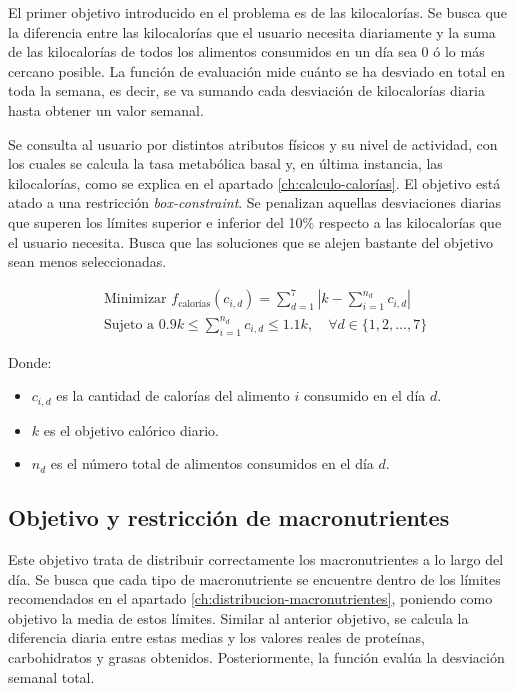 El primer objetivo introducido en el problema es de las kilocalorías. Se busca que la diferencia entre las kilocalorías que el usuario necesita diariamente y la suma de las kilocalorías de todos los alimentos consumidos en un día sea 0 ó lo más cercano posible. La función de evaluación mide cuánto se ha desviado en total en toda la semana, es decir, se va sumando cada desviación de kilocalorías diaria hasta obtener un valor semanal.

Se consulta al usuario por distintos atributos físicos y su nivel de actividad, con los cuales se calcula la tasa metabólica basal y, en última instancia, las kilocalorías, como se explica en el apartado \ref{ch:calculo-calorías}.
\newpage
El objetivo está atado a una restricción \textit{box-constraint}. Se penalizan aquellas desviaciones diarias que superen los límites superior e inferior del 10\% respecto a las kilocalorías que el usuario necesita. Busca que las soluciones que se alejen bastante del objetivo sean menos seleccionadas.
\begin{small}
\[
    \begin{aligned}
    & \text{Minimizar } f_{\text{calorías}}(c_{i,d}) = \sum_{d=1}^{7} \left| k - \sum_{i=1}^{n_d} c_{i,d} \right| \\
    & \text{Sujeto a } 0.9k \leq \sum_{i=1}^{n_d} c_{i,d} \leq 1.1k, \quad \forall d \in \{1, 2, \ldots, 7\}
    \end{aligned}
    \]

        Donde:
        \begin{itemize}
        \item \( c_{i,d} \) es la cantidad de calorías del alimento \( i \) consumido en el día \( d \).
        \item \( k \) es el objetivo calórico diario.
        \item \( n_d \) es el número total de alimentos consumidos en el día \( d \).
        \end{itemize}
\end{small}


\subsection{Objetivo y restricción de macronutrientes}
\label{ch:objetivo-restriccion-macronutrientes}

Este objetivo trata de distribuir correctamente los macronutrientes a lo largo del día. Se busca que cada tipo de macronutriente se encuentre dentro de los límites recomendados en el apartado \ref{ch:distribucion-macronutrientes}, poniendo como objetivo la media de estos límites. Similar al anterior objetivo, se calcula la diferencia diaria entre estas medias y los valores reales de proteínas, carbohidratos y grasas obtenidos. Posteriormente, la función evalúa la desviación semanal total.

